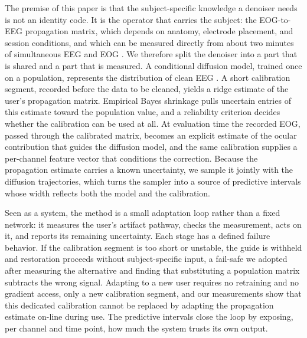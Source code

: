 The premise of this paper is that the subject-specific knowledge a denoiser needs is not an identity code. It is the operator that carries the subject: the EOG-to-EEG propagation matrix, which depends on anatomy, electrode placement, and session conditions, and which can be measured directly from about two minutes of simultaneous EEG and EOG \cite{gratton1983ocular,kobler2020sgeyesub}. We therefore split the denoiser into a part that is shared and a part that is measured. A conditional diffusion model, trained once on a population, represents the distribution of clean EEG \cite{ho2020ddpm,huang2025eegdfus}. A short calibration segment, recorded before the data to be cleaned, yields a ridge estimate of the user's propagation matrix. Empirical Bayes shrinkage pulls uncertain entries of this estimate toward the population value, and a reliability criterion decides whether the calibration can be used at all. At evaluation time the recorded EOG, passed through the calibrated matrix, becomes an explicit estimate of the ocular contribution that guides the diffusion model, and the same calibration supplies a per-channel feature vector that conditions the correction. Because the propagation estimate carries a known uncertainty, we sample it jointly with the diffusion trajectories, which turns the sampler into a source of predictive intervals whose width reflects both the model and the calibration.

Seen as a system, the method is a small adaptation loop rather than a fixed network: it measures the user's artifact pathway, checks the measurement, acts on it, and reports its remaining uncertainty. Each stage has a defined failure behavior. If the calibration segment is too short or unstable, the guide is withheld and restoration proceeds without subject-specific input, a fail-safe we adopted after measuring the alternative and finding that substituting a population matrix subtracts the wrong signal. Adapting to a new user requires no retraining and no gradient access, only a new calibration segment, and our measurements show that this dedicated calibration cannot be replaced by adapting the propagation estimate on-line during use. The predictive intervals close the loop by exposing, per channel and time point, how much the system trusts its own output.

